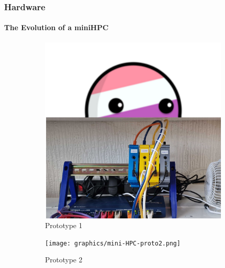 \begin{frame}
	\frametitle{Hardware}
	\framesubtitle{The Evolution of a miniHPC}

	\begin{figure}
		\centering
		\begin{subfigure}[b]{0.24\textwidth}
			\centering
			\includegraphics[width=\textwidth]{graphics/barba_with_miniHPC.png}
			\caption{Prototype 1}
			\label{fig:2.a}
		\end{subfigure}
		\hfill
		\begin{subfigure}[b]{0.24\textwidth}
			\centering
			\texttt{[image: graphics/mini-HPC-proto2.png]}
			\caption{Prototype 2}
			\label{fig:2.b}
		\end{subfigure}
		\hfill
		\begin{subfigure}[b]{0.24\textwidth}
			\centering

\end{subfigure}
\end{figure}
\end{frame}
